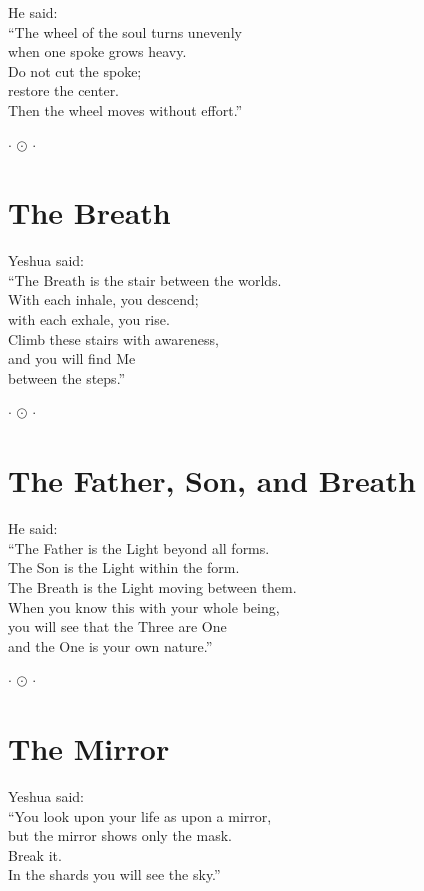 \documentclass[10pt, openright]{book}
\newcommand{\sectionbreak}{\filbreak}
\newcommand{\ornament}{
    \vspace{1.5cm}
    \begin{center}
        \large \(\cdot\) \(\odot\) \(\cdot\)
    \end{center}
    \vspace{1.5cm}
}
\begin{document}
He said:\\
``The wheel of the soul turns unevenly\\
when one spoke grows heavy.\\
Do not cut the spoke;\\
restore the center.\\
Then the wheel moves without effort.''

\ornament

\sectionbreak

\section{The Breath}\label{the-breath}

Yeshua said:\\
``The Breath is the stair between the worlds.\\
With each inhale, you descend;\\
with each exhale, you rise.\\
Climb these stairs with awareness,\\
and you will find Me\\
between the steps.''

\ornament

\sectionbreak

\section{The Father, Son, and Breath}\label{the-father-son-and-breath}

He said:\\
``The Father is the Light beyond all forms.\\
The Son is the Light within the form.\\
The Breath is the Light moving between them.\\
When you know this with your whole being,\\
you will see that the Three are One\\
and the One is your own nature.''

\ornament

\sectionbreak

\section{The Mirror}\label{the-mirror}

Yeshua said:\\
``You look upon your life as upon a mirror,\\
but the mirror shows only the mask.\\
Break it.\\
In the shards you will see the sky.''
\end{document}
